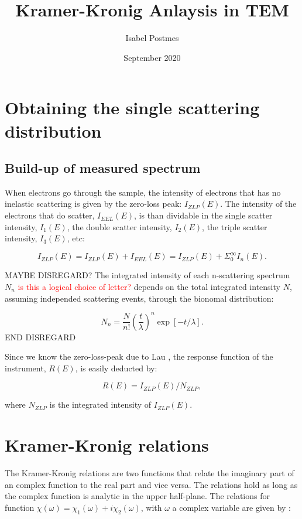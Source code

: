\documentclass{article}
\title{Kramer-Kronig Anlaysis in TEM}
\author{Isabel Postmes }
\date{September 2020}
\begin{document}
\maketitle

\section{Obtaining the single scattering distribution}

\subsection{Build-up of measured spectrum}
When electrons go through the sample, the intensity of electrons that has no inelastic scattering is given by the zero-loss peak: $I_{ZLP}(E)$. The intensity of the electrons that do scatter, $I_{EEL}(E)$, is than dividable in the single scatter intensity, $I_1(E)$, the double scatter intensity, $I_2(E)$, the triple scatter intensity, $I_3(E)$, etc:

\begin{equation}
    I_{ZLP}(E) = I_{ZLP}(E) + I_{EEL}(E) = I_{ZLP}(E) + \Sigma_0^\infty I_n(E).
\end{equation}


MAYBE DISREGARD?
The integrated intensity of each n-scattering spectrum $N_n$ \textcolor{red}{is this a logical choice of letter?} depends on the total integrated intensity $N$, assuming independed scattering events, through the bionomal distribution:

\begin{equation}
    N_n =  \frac{N}{n!} \left(\frac{t}{\lambda}\right)^n \exp{[-t/\lambda]} .
\end{equation}
END DISREGARD

Since we know the zero-loss-peak due to Lau \cite{lau}, the response function of the instrument, $R(E)$, is easily deducted by:

\begin{equation}
    R(E) = I_{ZLP}(E)/N_{ZLP},
\end{equation}

where $N_{ZLP}$ is the integrated intensity of $I_{ZLP}(E)$.


\section{Kramer-Kronig relations}
The Kramer-Kronig relations are two functions that relate the imaginary part of an complex function to the real part and vice versa. The relations hold as long as the complex function is analytic in the upper half-plane.
The relations for function $\chi(\omega)=\chi_{1}(\omega)+i \chi_{2}(\omega)$, with $\omega$ a complex variable are given by \cite{wikipedia_2020}:
\end{document}
